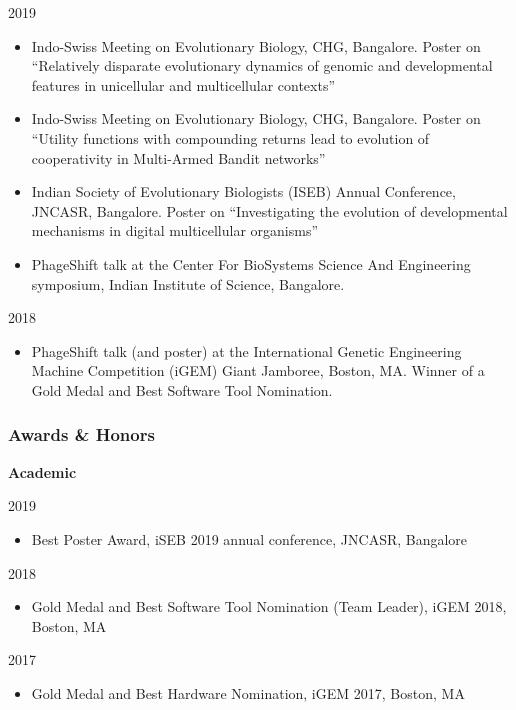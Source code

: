 \documentclass[
  letterpaper,
  DIV=11,
  numbers=noendperiod]{scrartcl}
\providecommand{\tightlist}{%
  \setlength{\itemsep}{0pt}\setlength{\parskip}{0pt}}\usepackage{longtable,booktabs,array}
\begin{document}
2019

\begin{itemize}
\item
  Indo-Swiss Meeting on Evolutionary Biology, CHG, Bangalore. Poster on
  ``Relatively disparate evolutionary dynamics of genomic and
  developmental features in unicellular and multicellular contexts''
\item
  Indo-Swiss Meeting on Evolutionary Biology, CHG, Bangalore. Poster on
  ``Utility functions with compounding returns lead to evolution of
  cooperativity in Multi-Armed Bandit networks''
\item
  Indian Society of Evolutionary Biologists (ISEB) Annual Conference,
  JNCASR, Bangalore. Poster on ``Investigating the evolution of
  developmental mechanisms in digital multicellular organisms''
\item
  PhageShift talk at the Center For BioSystems Science And Engineering
  symposium, Indian Institute of Science, Bangalore.
\end{itemize}

2018

\begin{itemize}
\tightlist
\item
  PhageShift talk (and poster) at the International Genetic Engineering
  Machine Competition (iGEM) Giant Jamboree, Boston, MA. Winner of a
  Gold Medal and Best Software Tool Nomination.
\end{itemize}

\subsubsection{Awards \& Honors}\label{awards-honors}

\textbf{Academic}

2019

\begin{itemize}
\tightlist
\item
  Best Poster Award, iSEB 2019 annual conference, JNCASR, Bangalore
\end{itemize}

2018

\begin{itemize}
\tightlist
\item
  Gold Medal and Best Software Tool Nomination (Team Leader), iGEM 2018,
  Boston, MA
\end{itemize}

2017

\begin{itemize}
\tightlist
\item
  Gold Medal and Best Hardware Nomination, iGEM 2017, Boston, MA
\end{itemize}
\end{document}
